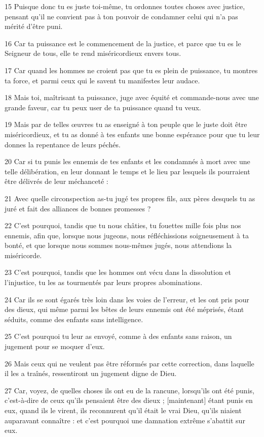 \par 15 Puisque donc tu es juste toi-même, tu ordonnes toutes choses avec justice, pensant qu'il ne convient pas à ton pouvoir de condamner celui qui n'a pas mérité d'être puni.
\par 16 Car ta puissance est le commencement de la justice, et parce que tu es le Seigneur de tous, elle te rend miséricordieux envers tous.
\par 17 Car quand les hommes ne croient pas que tu es plein de puissance, tu montres ta force, et parmi ceux qui le savent tu manifestes leur audace.
\par 18 Mais toi, maîtrisant ta puissance, juge avec équité et commande-nous avec une grande faveur, car tu peux user de ta puissance quand tu veux.
\par 19 Mais par de telles œuvres tu as enseigné à ton peuple que le juste doit être miséricordieux, et tu as donné à tes enfants une bonne espérance pour que tu leur donnes la repentance de leurs péchés.
\par 20 Car si tu punis les ennemis de tes enfants et les condamnés à mort avec une telle délibération, en leur donnant le temps et le lieu par lesquels ils pourraient être délivrés de leur méchanceté :
\par 21 Avec quelle circonspection as-tu jugé tes propres fils, aux pères desquels tu as juré et fait des alliances de bonnes promesses ?
\par 22 C'est pourquoi, tandis que tu nous châties, tu fouettes mille fois plus nos ennemis, afin que, lorsque nous jugeons, nous réfléchissions soigneusement à ta bonté, et que lorsque nous sommes nous-mêmes jugés, nous attendions la miséricorde.
\par 23 C'est pourquoi, tandis que les hommes ont vécu dans la dissolution et l'injustice, tu les as tourmentés par leurs propres abominations.
\par 24 Car ils se sont égarés très loin dans les voies de l'erreur, et les ont pris pour des dieux, qui même parmi les bêtes de leurs ennemis ont été méprisés, étant séduits, comme des enfants sans intelligence.
\par 25 C'est pourquoi tu leur as envoyé, comme à des enfants sans raison, un jugement pour se moquer d'eux.
\par 26 Mais ceux qui ne veulent pas être réformés par cette correction, dans laquelle il les a traînés, ressentiront un jugement digne de Dieu.
\par 27 Car, voyez, de quelles choses ils ont eu de la rancune, lorsqu'ils ont été punis, c'est-à-dire de ceux qu'ils pensaient être des dieux ; [maintenant] étant punis en eux, quand ils le virent, ils reconnurent qu'il était le vrai Dieu, qu'ils niaient auparavant connaître : et c'est pourquoi une damnation extrême s'abattit sur eux.

